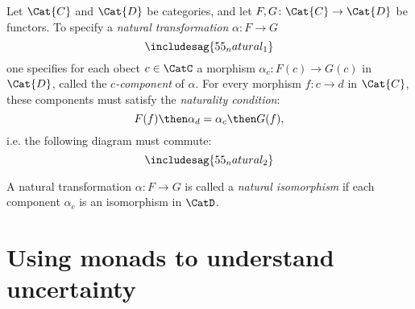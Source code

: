 

\begin{shaded}
\begin{definition}
Let $\Cat{C}$ and $\Cat{D}$ be categories, and let $F,G\colon \Cat{C}\to \Cat{D}$ be functors. To specify a \emph{natural transformation} $\alpha\colon F\to G$
\begin{equation}
\includesag{55_natural_1}
\end{equation}
one specifies for each obect $c\in \CatC$ a morphism $\alpha_c\colon F(c)\to G(c)$ in $\Cat{D}$, called the $c$\emph{-component} of $\alpha$. For every morphism $f\colon c\to d$ in $\Cat{C}$, these components must satisfy the \emph{naturality condition}:
\begin{equation}
    F(f)\then \alpha_d = \alpha_c\then G(f),
\end{equation}
i.e. the following diagram must commute:
\begin{equation}
\includesag{55_natural_2}
\end{equation}
\end{definition}

\begin{remark}
A natural transformation $\alpha\colon F\to G$ is called a \emph{natural isomorphism} if each component $\alpha_c$ is an isomorphism in $\CatD$.
\end{remark}
\end{shaded}


\section{Using monads to understand uncertainty }

